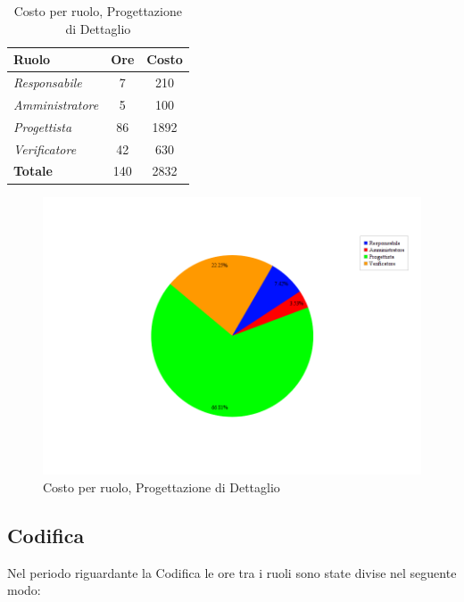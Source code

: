 \begin{table}[H]
	\begin{center}
		\begin{tabular}{|l|c|c|}
			\hline
			\textbf{Ruolo}	& \textbf{Ore} &	\textbf{Costo}	 \\
			\hline
			\textit{Responsabile}	&	7	&	210		\\
			\hline
			\textit{Amministratore}	&	5	&	100		\\
			\hline
			\textit{Progettista}		&	86	&	1892	\\
			\hline
			\textit{Verificatore}	&	42	&	630		\\
			\hline
			\textbf{Totale}	&	140	&	2832	\\
			\hline
		\end{tabular}
	\end{center}
	\caption{Costo per ruolo, Progettazione di Dettaglio}
\end{table}

\begin{figure}[H]
	\centering
	\includegraphics[scale=0.5]{immagini/Grafi/CostoPD}
	\caption{Costo per ruolo, Progettazione di Dettaglio}
\end{figure}

\newpage
\subsection{Codifica}
Nel periodo riguardante la Codifica le ore tra i ruoli sono state divise nel seguente modo:

